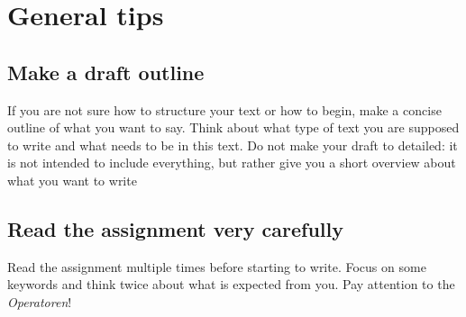 \documentclass{article}
\begin{document}
	\section{General tips}
	\subsection{Make a draft outline}
	If you are not sure how to structure your text or how to begin, make a concise outline of what you want to say. Think about what type of text you are supposed to write and what needs to be in this text. Do not make your draft to detailed: it is not intended to include everything, but rather give you a short overview about what you want to write

	\subsection{Read the assignment very carefully}
	Read the assignment multiple times before starting to write. Focus on some keywords and think twice about what is expected from you. Pay attention to the \textit{Operatoren}!
\end{document}
